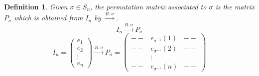 \documentclass[12pt]{article}
\newtheorem{definition}{Definition}[subsection]
\begin{document}
\begin{definition}
	Given $\sigma \in S_n$, the permutation matrix associated to $\sigma$ is 
	the matrix $P_{\sigma}$ which is obtained from $I_n$ by 
	$\overset{R:\sigma}{\longrightarrow}$.
	\[
		I_n \overset{R:\sigma}{\longrightarrow} P_{\sigma}
	\]
	\[
		I_n = 
		\begin{pmatrix}
			e_1 \\
			e_2 \\
			\vdots \\
			e_n
		\end{pmatrix}
		\overset{R:\sigma}{\longrightarrow} P_{\sigma}
		=
		\begin{pmatrix}
			-- & e_{\sigma^{-1}}(1) & -- \\
			-- & e_{\sigma^{-1}}(2) & -- \\
			   & \vdots & \\
			-- & e_{\sigma^{-1}}(n) & -- 
		\end{pmatrix}
	\]
\end{definition}
\end{document}

